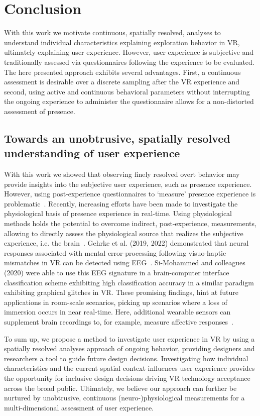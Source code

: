 \section{Conclusion}
With this work we motivate continuous, spatially resolved, analyses to understand individual characteristics explaining exploration behavior in VR, ultimately explaining user experience. However, user experience is subjective and traditionally assessed via questionnaires following the experience to be evaluated. The here presented approach exhibits several advantages. First, a continuous assessment is desirable over a discrete sampling after the VR experience and second, using active and continuous behavioral parameters without interrupting the ongoing experience to administer the questionnaire allows for a non-distorted assessment of presence.

\subsection{Towards an unobtrusive, spatially resolved understanding of user experience}
With this work we showed that observing finely resolved overt behavior may provide insights into the subjective user experience, such as presence experience. However, using post-experience questionnaires to `measure' presence experience is problematic~\cite{Slater2004-rn}. Recently, increasing efforts have been made to investigate the physiological basis of presence experience in real-time. Using physiological methods holds the potential to overcome indirect, post-experience, measurements, allowing to directly assess the physiological source that realizes the subjective experience, i.e. the brain~\cite{Gehrke2019, Singh2018, Si-mohammed2020, Gehrke2022-tj}. Gehrke et al. (2019, 2022) demonstrated that neural responses associated with mental error-processing following visuo-haptic mismatches in VR can be detected using EEG~\cite{Gehrke2019, Gehrke2022-tj}. Si-Mohammed and colleagues (2020) were able to use this EEG signature in a brain-computer interface classification scheme exhibiting high classification accuracy in a similar paradigm exhibiting graphical glitches in VR. These promising findings, hint at future applications in room-scale scenarios, picking up scenarios where a loss of immersion occurs in near real-time. Here, additional wearable sensors can supplement brain recordings to, for example, measure affective responses~\cite{Marin-Morales2018}.

To sum up, we propose a method to investigate user experience in VR by using a spatially resolved analyses approach of ongoing behavior, providing designers and researchers a tool to guide future design decisions. Investigating how individual characteristics and the current spatial context influences user experience provides the opportunity for inclusive design decisions driving VR technology acceptance across the broad public. Ultimately, we believe our approach can further be nurtured by unobtrusive, continuous (neuro-)physiological measurements for a multi-dimensional assessment of user experience.


